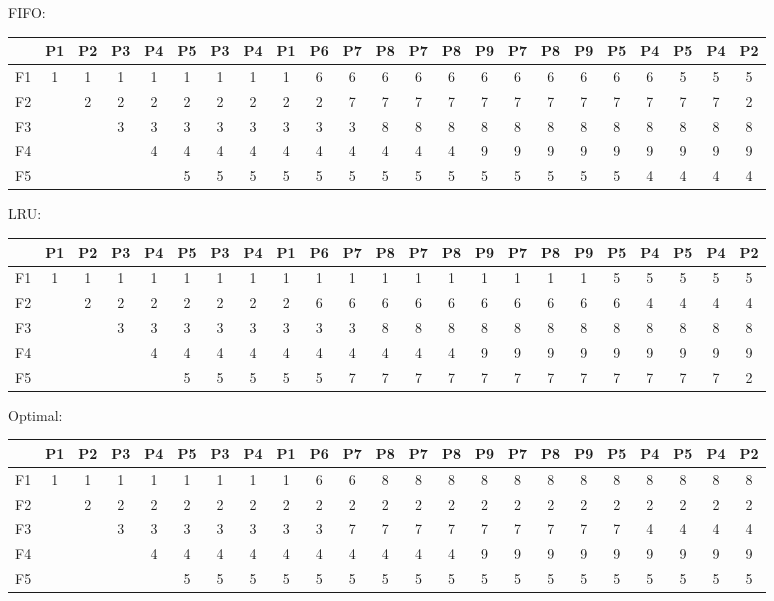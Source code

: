 \begin{latin}
    FIFO:
    {
    \scriptsize
    \center
    \begin{tabular}{c|c|c|c|c|c|c|c|c|c|c|c|c|c|c|c|c|c|c|c|c|c|c}
        & P1 & P2 & P3 & P4 & P5 & P3 & P4 & P1 & P6 & P7 & P8 & P7 & P8 & P9 & P7 & P8 & P9 & P5 & P4 & P5 & P4 & P2\\
        \hline
        F1 & 1 & 1 & 1 & 1 & 1 & 1 & 1 & 1 & 6 & 6 & 6 & 6 & 6 & 6 & 6 & 6 & 6 & 6 & 6 & 5 & 5 & 5\\
        F2 &   & 2 & 2 & 2 & 2 & 2 & 2 & 2 & 2 & 7 & 7 & 7 & 7 & 7 & 7 & 7 & 7 & 7 & 7 & 7 & 7 & 2\\
        F3 &   &   & 3 & 3 & 3 & 3 & 3 & 3 & 3 & 3 & 8 & 8 & 8 & 8 & 8 & 8 & 8 & 8 & 8 & 8 & 8 & 8\\
        F4 &   &   &   & 4 & 4 & 4 & 4 & 4 & 4 & 4 & 4 & 4 & 4 & 9 & 9 & 9 & 9 & 9 & 9 & 9 & 9 & 9\\
        F5 &   &   &   &   & 5 & 5 & 5 & 5 & 5 & 5 & 5 & 5 & 5 & 5 & 5 & 5 & 5 & 5 & 4 & 4 & 4 & 4
    \end{tabular}
    }
    LRU:
    {
    \scriptsize
    \center
    \begin{tabular}{c|c|c|c|c|c|c|c|c|c|c|c|c|c|c|c|c|c|c|c|c|c|c}
        & P1 & P2 & P3 & P4 & P5 & P3 & P4 & P1 & P6 & P7 & P8 & P7 & P8 & P9 & P7 & P8 & P9 & P5 & P4 & P5 & P4 & P2\\
        \hline
        F1 & 1 & 1 & 1 & 1 & 1 & 1 & 1 & 1 & 1 & 1 & 1 & 1 & 1 & 1 & 1 & 1 & 1 & 5 & 5 & 5 & 5 & 5 \\
        F2 &   & 2 & 2 & 2 & 2 & 2 & 2 & 2 & 6 & 6 & 6 & 6 & 6 & 6 & 6 & 6 & 6 & 6 & 4 & 4 & 4 & 4 \\
        F3 &   &   & 3 & 3 & 3 & 3 & 3 & 3 & 3 & 3 & 8 & 8 & 8 & 8 & 8 & 8 & 8 & 8 & 8 & 8 & 8 & 8 \\
        F4 &   &   &   & 4 & 4 & 4 & 4 & 4 & 4 & 4 & 4 & 4 & 4 & 9 & 9 & 9 & 9 & 9 & 9 & 9 & 9 & 9 \\
        F5 &   &   &   &   & 5 & 5 & 5 & 5 & 5 & 7 & 7 & 7 & 7 & 7 & 7 & 7 & 7 & 7 & 7 & 7 & 7 & 2 
    \end{tabular}
    }
    Optimal:
    {
    \scriptsize
    \center
    \begin{tabular}{c|c|c|c|c|c|c|c|c|c|c|c|c|c|c|c|c|c|c|c|c|c|c}
        & P1 & P2 & P3 & P4 & P5 & P3 & P4 & P1 & P6 & P7 & P8 & P7 & P8 & P9 & P7 & P8 & P9 & P5 & P4 & P5 & P4 & P2\\
        \hline
        F1 & 1 & 1 & 1 & 1 & 1 & 1 & 1 & 1 & 6 & 6 & 8 & 8 & 8 & 8 & 8 & 8 & 8 & 8 & 8 & 8 & 8 & 8 \\
        F2 &   & 2 & 2 & 2 & 2 & 2 & 2 & 2 & 2 & 2 & 2 & 2 & 2 & 2 & 2 & 2 & 2 & 2 & 2 & 2 & 2 & 2 \\
        F3 &   &   & 3 & 3 & 3 & 3 & 3 & 3 & 3 & 7 & 7 & 7 & 7 & 7 & 7 & 7 & 7 & 7 & 4 & 4 & 4 & 4 \\
        F4 &   &   &   & 4 & 4 & 4 & 4 & 4 & 4 & 4 & 4 & 4 & 4 & 9 & 9 & 9 & 9 & 9 & 9 & 9 & 9 & 9 \\
        F5 &   &   &   &   & 5 & 5 & 5 & 5 & 5 & 5 & 5 & 5 & 5 & 5 & 5 & 5 & 5 & 5 & 5 & 5 & 5 & 5 
    \end{tabular}
    }
\end{latin}